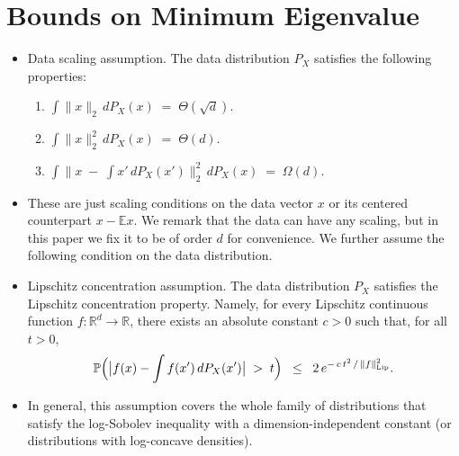 \documentclass[serif, aspectratio=169]{beamer}
\begin{document}
\section{Bounds on Minimum Eigenvalue}


\begin{frame}
\begin{itemize}
	\item Data scaling assumption.
		The data distribution $P_X$ satisfies the following properties:
		\begin{enumerate}
			\item $\displaystyle \int \|x\|_{2}\, dP_X(x) \;=\; \Theta(\sqrt{d}).$
			\item $\displaystyle \int \|x\|_{2}^{2}\, dP_X(x) \;=\; \Theta(d).$
			\item $\displaystyle \int \bigl\|x \;-\; \int x' \, dP_X(x')\bigr\|_{2}^{2}\, dP_X(x) 
			\;=\; \Omega(d).$
		\end{enumerate}
		\item These are just scaling conditions on the data vector $x$ or its centered 
		counterpart $x - \mathbb{E}x$. We remark that the data can have any scaling, 
		but in this paper we fix it to be of order $d$ for convenience. We further 
		assume the following condition on the data distribution.
	

\end{itemize}
\end{frame}

\begin{frame}
	\begin{itemize}
			\item Lipschitz concentration assumption.
		The data distribution $P_X$ satisfies the Lipschitz concentration property. 
		Namely, for every Lipschitz continuous function 
		$f : \mathbb{R}^d \to \mathbb{R}$, there exists an absolute constant $c > 0$ 
		such that, for all $t > 0$,
		\[
		\mathbb{P}\Bigl(\bigl|f(x) - \int f(x')\,dP_X(x')\bigr| \;>\; t\Bigr)
		\;\;\le\;\; 2\,e^{-\,c\,t^2\,/\,\|f\|_{\mathrm{Lip}}^2}.
		\]
		\item In general, this assumption covers the whole family of distributions that satisfy 
		the log-Sobolev inequality with a dimension-independent constant (or distributions
		with log-concave densities).
	\end{itemize}
\end{frame}
\end{document}
